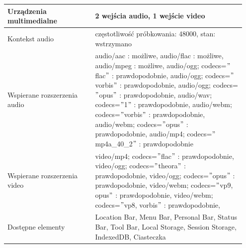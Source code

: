\begin{table}[p]
\begin{tabular}{|p{0.35\linewidth} | p{0.6\linewidth}|}
        Urządzenia multimedialne     & 2 wejścia audio, 1 wejście video                                                                                                                                                                                                                                                                                                                                                                                                              \\ \hline
        Kontekst audio               & częstotliwość próbkowania: 48000, stan: wstrzymano                                                                                                                                                                                                                                                                                                                                                                                            \\ \hline
        Wspierane rozszerzenia audio & audio/aac : możliwe, audio/flac : możliwe, audio/mpeg : możliwe, audio/ogg; codecs=\("\)flac\("\)  : prawdopodobnie, audio/ogg; codecs=\("\)vorbis\("\) : prawdopodobnie, audio/ogg; codecs=\("\)opus\("\) : prawdopodobnie, audio/wav; codecs=\("\)1\("\) : prawdopodobnie, audio/webm; codecs=\("\)vorbis\("\) : prawdopodobnie, audio/webm; codecs=\("\)opus\("\) : prawdopodobnie, audio/mp4; codecs=\("\)mp4a\_40\_2\("\) : prawdopodobnie \\ \hline
        Wspierane rozszerzenia video & video/mp4; codecs=\("\)flac\("\) : prawdopodobnie, video/ogg; codecs=\("\)theora\("\) : prawdopodobnie, video/ogg; codecs=\("\)opus\("\) : prawdopodobnie, video/webm; codecs=\("\)vp9, opus\("\) : prawdopodobnie, video/webm; codecs=\("\)vp8, vorbis\("\) : prawdopodobnie,                                                                                                                                                                \\ \hline
        Dostępne elementy            & Location Bar, Menu Bar, Personal Bar, Status Bar, Tool Bar, Local Storage, Session Storage, IndexedDB, Ciasteczka                                                                                                                                                                                                                                                                                                                             \\ \hline
    \end{tabular}
    \label{tab:http-js-attributes}
\end{table}

